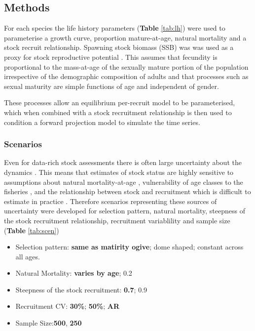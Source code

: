 \documentclass[12pt,doublespacing,a4paper]{ouparticle}
\begin{document}
\subsection{Methods}

For each species the life history parameters (\textbf{Table} \ref{tab:lh}) were used to parameterise a \cite{vonbert1957quantitative} growth curve, proportion mature-at-age, natural mortality \citep{lorenzen2002density} and a \cite{beverton1993dynamics} stock recruit relationship. Spawning stock biomass (SSB) was was used as a proxy for stock reproductive potential \citep[SRP][]{trippel_estimation_1999}. This assumes that fecundity is proportional to the mass-at-age of the sexually mature portion of the population irrespective of the demographic composition of adults \citep{murawski_impacts_2001} and that processes such as sexual maturity are simple functions of age \citep{matsuda_inconsistency_1996} and independent of gender.

These processes allow an equilibrium per-recruit model to be parameterised, which when combined with a stock recruitment relationship \cite{sissenwine1987alternative} is then used to condition a forward projection model to simulate the time series.

\subsubsection{Scenarios}

Even for data-rich stock assessments there is often large uncertainty about the dynamics \citep[i.e. model uncertainty;][]{punt2008refocusing}. This means that estimates of stock status are highly sensitive to assumptions about natural mortality-at-age \citep{jiao2012modelling}, vulnerability of age classes to the fisheries \citep{brooks2009analytical}, and the relationship between stock and recruitment which is difficult to estimate in practice \citep[e.g.][]{vert2013frequency,szuwalski2014examining,cury2014resolving,kell2015spawning,pepin2015reconsidering}. Therefore scenarios \citep[][]{ono2015importance,kell2015spawning,boorman1997recognising} representing these sources of uncertainty were developed for selection pattern, natural mortality, steepness of the stock recruitment relationship, recruitment variablility and sample size (\textbf{Table} \ref{tab:scen})

\begin{itemize}
 \item Selection pattern: \textbf{same as matirity ogive}; dome shaped; constant across all ages.
 \item Natural Mortality: \textbf{varies by age}; 0.2 
 \item Steepness of the stock recruitment: \textbf{0.7}; 0.9 
 \item Recruitment CV: \textbf{30\%}; \textbf{50\%}; \textbf{AR}
 \item Sample Size:\textbf{500}, \textbf{250}
\end{itemize}
\end{document}
